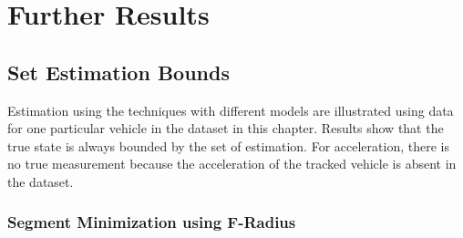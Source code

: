 \chapter{Further Results}
\FloatBarrier
\section{Set Estimation Bounds}\label{eresult:setest}
\FloatBarrier
Estimation using the techniques with different models are illustrated using data for one particular vehicle in the dataset in this chapter. Results show that the true state is always bounded by the set of estimation. For acceleration, there is no true measurement because the acceleration of the tracked vehicle is absent in the dataset.

\subsection{Segment Minimization using F-Radius}
\FloatBarrier
